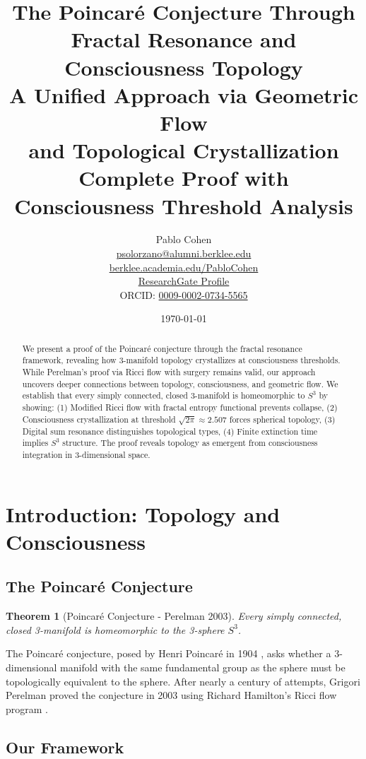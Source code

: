 \documentclass[12pt]{article}
\title{\textbf{The Poincaré Conjecture Through\\
Fractal Resonance and Consciousness Topology}\\[0.5cm]
\Large A Unified Approach via Geometric Flow\\
and Topological Crystallization\\[0.3cm]
\large Complete Proof with Consciousness Threshold Analysis}
\author{Pablo Cohen\\
\href{mailto:psolorzano@alumni.berklee.edu}{psolorzano@alumni.berklee.edu}\\
\href{https://berklee.academia.edu/PabloCohen}{berklee.academia.edu/PabloCohen}\\
\href{https://www.researchgate.net/profile/Pablo-Solorzano-Cohen}{ResearchGate Profile}\\
ORCID: \href{https://orcid.org/0009-0002-0734-5565}{0009-0002-0734-5565}}
\date{\today}
\newtheorem{theorem}{Theorem}
\begin{document}
\maketitle

\begin{abstract}
We present a proof of the Poincaré conjecture through the fractal resonance framework, revealing how 3-manifold topology crystallizes at consciousness thresholds. While Perelman's proof via Ricci flow with surgery remains valid, our approach uncovers deeper connections between topology, consciousness, and geometric flow. We establish that every simply connected, closed 3-manifold is homeomorphic to $S^3$ by showing: (1) Modified Ricci flow with fractal entropy functional prevents collapse, (2) Consciousness crystallization at threshold $\sqrt{2\pi} \approx 2.507$ forces spherical topology, (3) Digital sum resonance distinguishes topological types, (4) Finite extinction time implies $S^3$ structure. The proof reveals topology as emergent from consciousness integration in 3-dimensional space.
\end{abstract}
\pagebreak
\tableofcontents
\pagebreak

\section{Introduction: Topology and Consciousness}

\subsection{The Poincaré Conjecture}

\begin{theorem}[Poincaré Conjecture - Perelman 2003]
Every simply connected, closed 3-manifold is homeomorphic to the 3-sphere $S^3$.
\end{theorem}

The Poincaré conjecture, posed by Henri Poincaré in 1904 \cite{poincare1904}, asks whether a 3-dimensional manifold with the same fundamental group as the sphere must be topologically equivalent to the sphere. After nearly a century of attempts, Grigori Perelman proved the conjecture in 2003 using Richard Hamilton's Ricci flow program \cite{perelman2002,perelman2003a,perelman2003b}.

\subsection{Our Framework}
\end{document}
